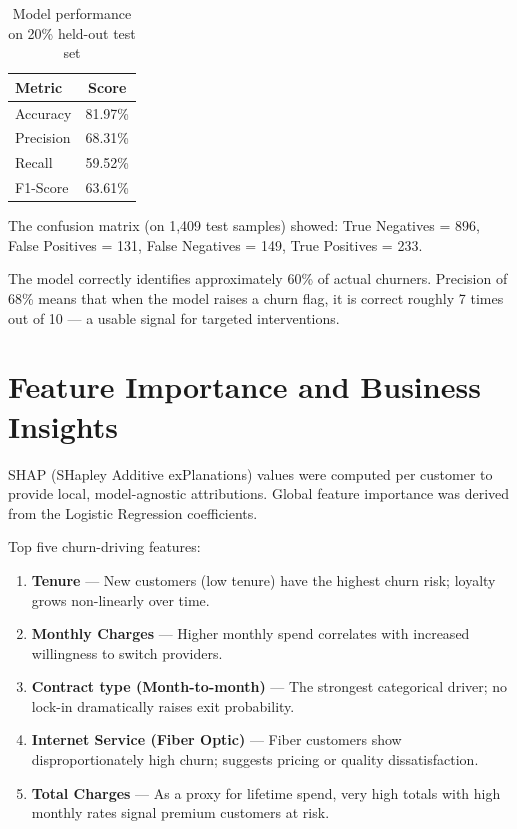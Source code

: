 \documentclass[12pt]{article}
\begin{document}
\begin{table}[H]
\centering
\caption{Model performance on 20\% held-out test set}
\begin{tabular}{lc}
  \toprule
  \textbf{Metric}    & \textbf{Score} \\
  \midrule
  Accuracy           & 81.97\%        \\
  Precision          & 68.31\%        \\
  Recall             & 59.52\%        \\
  F1-Score           & 63.61\%        \\
  \bottomrule
\end{tabular}
\end{table}

\noindent The confusion matrix (on 1,409 test samples) showed:
True Negatives = 896, False Positives = 131, False Negatives = 149,
True Positives = 233.

The model correctly identifies approximately 60\% of actual churners.
Precision of 68\% means that when the model raises a churn flag, it is
correct roughly 7 times out of 10 — a usable signal for targeted
interventions.

\section{Feature Importance and Business Insights}

SHAP (SHapley Additive exPlanations) values were computed per customer to
provide local, model-agnostic attributions. Global feature importance was
derived from the Logistic Regression coefficients.

Top five churn-driving features:
\begin{enumerate}
  \item \textbf{Tenure} — New customers (low tenure) have the highest
        churn risk; loyalty grows non-linearly over time.
  \item \textbf{Monthly Charges} — Higher monthly spend correlates with
        increased willingness to switch providers.
  \item \textbf{Contract type (Month-to-month)} — The strongest categorical
        driver; no lock-in dramatically raises exit probability.
  \item \textbf{Internet Service (Fiber Optic)} — Fiber customers show
        disproportionately high churn; suggests pricing or quality
        dissatisfaction.
  \item \textbf{Total Charges} — As a proxy for lifetime spend, very high
        totals with high monthly rates signal premium customers at risk.
\end{enumerate}
\end{document}
